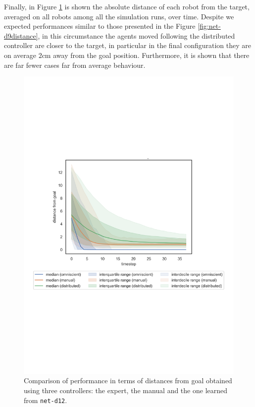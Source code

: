Finally, in Figure \ref{fig:net-d12distance} is shown the absolute distance of 
each robot from the target, averaged on all robots among all the simulation runs, 
over time. 
Despite we expected performances similar to those presented in the Figure 
\ref{fig:net-d9distance}, in this circumstance the agents moved following the 
distributed controller are closer to the target, in particular in the final 
configuration they are on average $2$\gls{cm} away from the goal position. 
Furthermore, it is shown that there are far fewer cases far from average 
behaviour.
\begin{figure}[!htb]
	\centering
	\includegraphics[width=.65\textwidth]{contents/images/net-d12/distances-from-goal-compressed-distributed}%
	\caption[Evaluation of \texttt{net-d1} distances from goal.]{Comparison of 
		performance in terms of distances from goal obtained using three 
		controllers: 
		the expert, the manual and the one learned from \texttt{net-d12}.}
	\label{fig:net-d12distance}
\end{figure}

